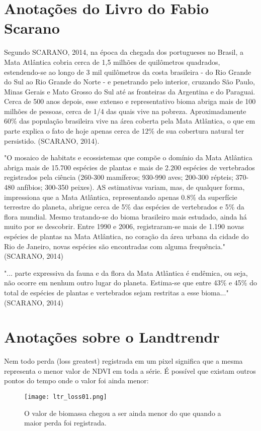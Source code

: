 \documentclass{article}
\begin{document}
\section{Anotações do Livro do Fabio Scarano}

Segundo SCARANO, 2014, na época da chegada dos portugueses no Brasil, a Mata Atlântica cobria cerca de 1,5 milhões de quilômetros quadrados, estendendo-se ao longo de 3 mil quilômetros da costa brasileira - do Rio Grande do Sul ao Rio Grande do Norte - e penetrando pelo interior, cruzando São Paulo, Minas Gerais e Mato Grosso do Sul até as fronteiras da Argentina e do Paraguai. Cerca de 500 anos depois, esse extenso e representativo bioma abriga mais de 100 milhões de pessoas, cerca de 1/4 das quais vive na pobreza. Aproximadamente 60\% das população brasileira vive na área coberta pela Mata Atlântica, o que em parte explica o fato de hoje apenas cerca de 12\% de sua cobertura natural ter persistido. (SCARANO, 2014).

"O mosaico de habitats e ecossistemas que compõe o domínio da Mata Atlântica abriga mais de 15.700 espécies de plantas e mais de 2.200 espécies de vertebrados registrados pela ciência (260-300 mamíferos; 930-990 aves; 200-300 répteis; 370-480 anfíbios; 300-350 peixes). AS estimativas variam, mas, de qualquer forma, impressiona que a Mata Atlântica, representando apenas 0.8\% da superfície terrestre do planeta, abrigue cerca de 5\% das espécies de vertebrados e 5\% da flora mundial. Mesmo tratando-se do bioma brasileiro mais estudado, ainda há muito por se descobrir. Entre 1990 e 2006, registraram-se mais de 1.190 novas espécies de plantas na Mata Atlântica, no coração da área urbana da cidade do Rio de Janeiro, novas espécies são encontradas com alguma frequência." (SCARANO, 2014)

"... parte expressiva da fauna e da flora da Mata Atlântica é endêmica, ou seja, não ocorre em nenhum outro lugar do planeta. Estima-se que entre 43\% e 45\% do total de espécies de plantas e vertebrados sejam restritas a esse bioma..." (SCARANO, 2014)


\section{Anotações sobre o Landtrendr}
Nem todo perda (loss greatest) registrada em um pixel significa que a mesma representa o menor valor de NDVI em toda a série. É possível que existam outros pontos do tempo onde o valor foi ainda menor:
\begin{figure}[htp]
    \centering
    \texttt{[image: ltr\_loss01.png]}
    \caption{O valor de biomassa chegou a ser ainda menor do que quando a maior perda foi registrada.}
    \label{fig:galaxy}
\end{figure}
\end{document}
